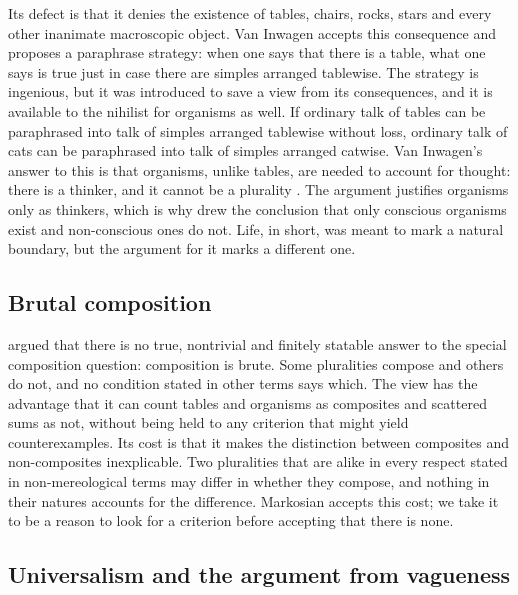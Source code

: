 \documentclass{situationist-preprint}
\begin{document}
Its defect is that it denies the existence of tables, chairs, rocks, stars and every other inanimate macroscopic object. Van Inwagen accepts this consequence and proposes a paraphrase strategy: when one says that there is a table, what one says is true just in case there are simples arranged tablewise. The strategy is ingenious, but it was introduced to save a view from its consequences, and it is available to the nihilist for organisms as well. If ordinary talk of tables can be paraphrased into talk of simples arranged tablewise without loss, ordinary talk of cats can be paraphrased into talk of simples arranged catwise. Van Inwagen's answer to this is that organisms, unlike tables, are needed to account for thought: there is a thinker, and it cannot be a plurality \citep{vanInwagen1990}. The argument justifies organisms only as thinkers, which is why \citet{Merricks2001} drew the conclusion that only conscious organisms exist and non-conscious ones do not. Life, in short, was meant to mark a natural boundary, but the argument for it marks a different one.

\subsection{Brutal composition}

\citet{Markosian1998} argued that there is no true, nontrivial and finitely statable answer to the special composition question: composition is brute. Some pluralities compose and others do not, and no condition stated in other terms says which. The view has the advantage that it can count tables and organisms as composites and scattered sums as not, without being held to any criterion that might yield counterexamples. Its cost is that it makes the distinction between composites and non-composites inexplicable. Two pluralities that are alike in every respect stated in non-mereological terms may differ in whether they compose, and nothing in their natures accounts for the difference. Markosian accepts this cost; we take it to be a reason to look for a criterion before accepting that there is none.

\subsection{Universalism and the argument from vagueness}
\end{document}
